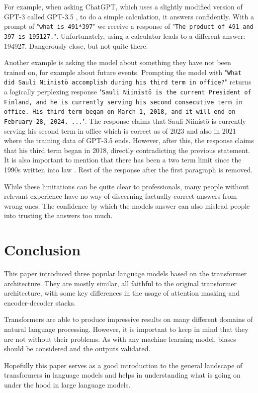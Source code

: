 \documentclass[twoside]{article}
\begin{document}
For example, when asking ChatGPT, which uses a slightly modified version of GPT-3 called 
GPT-3.5 \cite{noauthor_introducing_nodate-1}, to do a simple calculation, it answers confidently. 
With a prompt of "\texttt{what is 491*397}" we receive a response of 
"\texttt{The product of 491 and 397 is 195127.}". Unfortunately, using a calculator
leads to a different answer: 194927. Dangerously close, but not quite there.

Another example is asking the model about something they have not been trained on, for
example about future events. Prompting the model with 
"\texttt{What did Sauli Niinistö accomplish during his third term in office?}" returns
a logically perplexing response "\texttt{Sauli Niinistö is the current President of Finland, 
and he is currently serving his second consecutive term in office. 
His third term began on March 1, 2018, and it will end on February 28, 2024. ...}".
The response claims that Sauli Niinistö is currently serving his second term in office
which is correct as of 2023 and also in 2021 where the training data of GPT-3.5 ends. 
However, after this, the response claims that his third term began
in 2018, directly contradicting the previous statement. It is also important to mention
that there has been a two term limit since the 1990s written into law 
\cite{oy_finlex_nodate}. Rest of the response after the first paragraph is removed.

While these limitations can be quite clear to professionals, many people without relevant
experience have no way of discerning factually correct answers from wrong ones. The confidence
by which the models answer can also mislead people into trusting the answers too much.


\section{Conclusion}
This paper introduced three popular language models based on the transformer architecture.
They are mostly similar, all faithful to the original transformer architecture, with
some key differences in the usage of attention masking and encoder-decoder stacks.

Transformers are able to produce impressive results on many different domains of natural
language processing. However, it is important to keep in mind that they are not without 
their problems. As with any machine learning model,
biases should be considered and the outputs validated. 

Hopefully this paper serves as a good introduction to the general landscape of 
transformers in language models and helps in understanding what is going on 
under the hood in large language models.

\printbibliography
\end{document}
